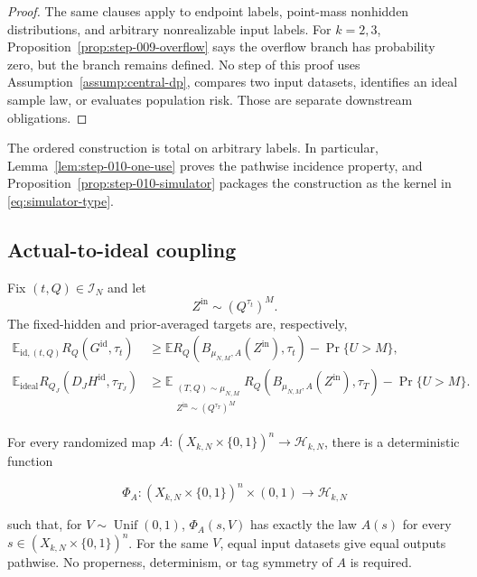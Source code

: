 \begin{proof}
The same clauses apply to endpoint labels, point-mass nonhidden
distributions, and arbitrary nonrealizable input labels. For \(k=2,3\),
Proposition~\ref{prop:step-009-overflow} says the overflow branch
has probability zero, but the branch remains defined. No step of this proof
uses Assumption~\ref{assump:central-dp}, compares two input datasets,
identifies an ideal sample law, or evaluates population risk. Those are
separate downstream obligations.
\end{proof}
The ordered construction is total on arbitrary labels.  In particular,
Lemma~\ref{lem:step-010-one-use} proves the pathwise incidence property,
and Proposition~\ref{prop:step-010-simulator} packages the construction as
the kernel in \eqref{eq:simulator-type}.

\subsection{Actual-to-ideal coupling}\label{app:step-011}
Fix $(t,Q)\in\mathcal I_N$ and let
\begin{equation}
Z^{\mathrm{in}}\sim(Q^{\tau_t})^M.
\tag{3}\label{eq:coupling-input-law}
\end{equation}
The fixed-hidden and prior-averaged targets are, respectively,
\begin{align}
\mathbb E_{\mathrm{id},(t,Q)}R_Q(G^{\mathrm{id}},\tau_t)
&\ge
\mathbb E R_Q(B_{\mu_{N,M},A}(Z^{\mathrm{in}}),\tau_t)
-\Pr\{U>M\},
\tag{4a}\label{eq:fixed-hidden-transfer}\\
\mathbb E_{\mathrm{ideal}}R_{Q_J}(D_JH^{\mathrm{id}},\tau_{T_J})
&\ge
\mathbb E_{\substack{(T,Q)\sim\mu_{N,M}\\
Z^{\mathrm{in}}\sim(Q^{\tau_T})^M}}
R_Q(B_{\mu_{N,M},A}(Z^{\mathrm{in}}),\tau_T)
-\Pr\{U>M\}.
\tag{4b}\label{eq:prior-transfer}
\end{align}
\begin{lemma}\label{lem:step-011-shared-randomization}
For every randomized map
\(A:(X_{k,N}\times\{0,1\})^n\to\mathcal H_{k,N}\), there is a
deterministic function

\[
  \Phi_A:(X_{k,N}\times\{0,1\})^n\times(0,1)
  \longrightarrow\mathcal H_{k,N}
\]

such that, for \(V\sim\operatorname{Unif}(0,1)\),
\(\Phi_A(s,V)\) has exactly the law \(A(s)\) for every
\(s\in(X_{k,N}\times\{0,1\})^n\). For the same \(V\), equal input datasets give equal
outputs pathwise. No properness, determinism, or tag symmetry of \(A\) is
required.
\end{lemma}

